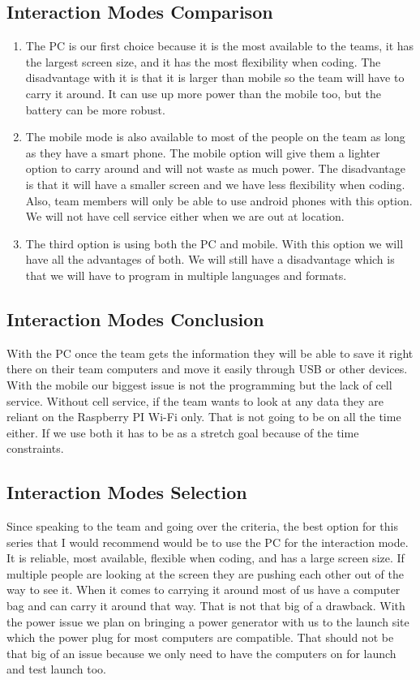 \documentclass[10pt,draftclsnofoot,onecolumn]{IEEEtran}
\begin{document}
   \subsection{Interaction Modes Comparison}
   \begin{enumerate}
   \item
    The PC is our first choice because it is the most available to the teams, it has the largest screen size, and it has the most flexibility when coding.  The disadvantage with it is that it is larger than mobile so the team will have to carry it around.  It can use up more power than the mobile too, but the battery can be more robust.\\ 
   \item
     The mobile mode is also available to most of the people on the team as long as they have a smart phone.  The mobile option will give them a lighter option to carry around and will not waste as much power.  The disadvantage is that it will have a smaller screen and we have less flexibility when coding.  Also, team members will only be able to use android phones with this option.  We will not have cell service either when we are out at location.\\ 
   \item
    The third option is using both the PC and mobile.  With this option we will have all the advantages of both.  We will still have a disadvantage which is that we will have to program in multiple languages and formats. 
   \end {enumerate}
    \subsection{Interaction Modes Conclusion}
     With the PC once the team gets the information they will be able to save it right there on their team computers and move it easily through USB or other devices.  With the mobile our biggest issue is not the programming but the lack of cell service.  Without cell service, if the team wants to look at any data they are reliant on the Raspberry PI Wi-Fi only.  That is not going to be on all the time either.   If we use both it has to be as a stretch goal because of the time constraints.  
     \subsection{Interaction Modes Selection}
      Since speaking to the team and going over the criteria, the best option for this series that I would recommend would be to use the PC for the interaction mode.  It is reliable, most available, flexible when coding, and has a large screen size. If multiple people are looking at the screen they are pushing each other out of the way to see it.  When it comes to carrying it around most of us have a computer bag and can carry it around that way.  That is not that big of a drawback.  With the power issue we plan on bringing a power generator with us to the launch site which the power plug for most computers are compatible.  That should not be that big of an issue because we only need to have the computers on for launch and test launch too.
\end{document}
